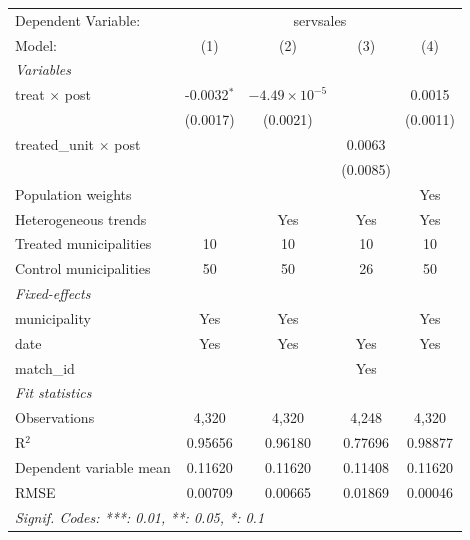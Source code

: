 
\begingroup
\centering
\begin{tabular}{lcccc}
   \tabularnewline \midrule \midrule
   Dependent Variable: & \multicolumn{4}{c}{servsales}\\
   Model:                        & (1)           & (2)                    & (3)      & (4)\\  
   \midrule
   \emph{Variables}\\
   treat $\times$ post           & -0.0032$^{*}$ & $-4.49\times 10^{-5}$  &          & 0.0015\\   
                                 & (0.0017)      & (0.0021)               &          & (0.0011)\\   
   treated\_unit $\times$ post   &               &                        & 0.0063   &   \\   
                                 &               &                        & (0.0085) &   \\   
   Population weights            &               &                        &          & Yes\\  
   Heterogeneous trends          &               & Yes                    & Yes      & Yes\\  
   Treated municipalities        & 10            & 10                     & 10       & 10\\  
   Control municipalities        & 50            & 50                     & 26       & 50\\  
   \midrule
   \emph{Fixed-effects}\\
   municipality                  & Yes           & Yes                    &          & Yes\\  
   date                          & Yes           & Yes                    & Yes      & Yes\\  
   match\_id                     &               &                        & Yes      & \\  
   \midrule
   \emph{Fit statistics}\\
   Observations                  & 4,320         & 4,320                  & 4,248    & 4,320\\  
   R$^2$                         & 0.95656       & 0.96180                & 0.77696  & 0.98877\\  
   Dependent variable mean       & 0.11620       & 0.11620                & 0.11408  & 0.11620\\  
   RMSE                          & 0.00709       & 0.00665                & 0.01869  & 0.00046\\  
   \midrule \midrule
   \multicolumn{5}{l}{\emph{Signif. Codes: ***: 0.01, **: 0.05, *: 0.1}}\\
\end{tabular}
\par\endgroup


